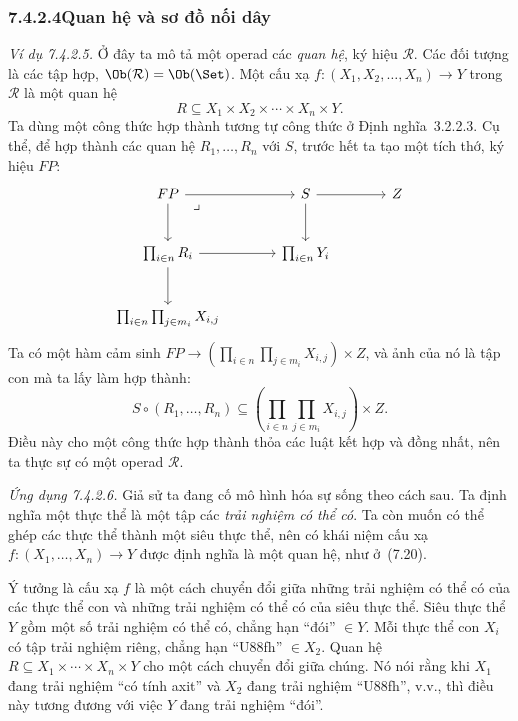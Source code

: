 \subsubsection*{7.4.2.4\quad Quan hệ và sơ đồ nối dây}
\noindent\textit{Ví dụ 7.4.2.5.}\keepwithnext
Ở đây ta mô tả một operad các \emph{quan hệ}, ký hiệu $\mathcal R$. Các đối tượng là các tập hợp, $\Ob(\mathcal R)=\Ob(\Set)$. Một cấu xạ $f:(X_1,X_2,\ldots,X_n)\to Y$ trong $\mathcal R$ là một quan hệ
\begin{equation}
R\subseteq X_1\times X_2\times\cdots\times X_n\times Y.
\tag{7.20}
\end{equation}
Ta dùng một công thức hợp thành tương tự công thức ở Định nghĩa~3.2.2.3. Cụ thể, để hợp thành các quan hệ $R_1,\ldots,R_n$ với $S$, trước hết ta tạo một tích thớ, ký hiệu $FP$:
\[
\begin{tikzcd}[column sep=large,row sep=large]
FP\arrow[r]\arrow[d]\arrow[dr,phantom,"\lrcorner",very near start]&S\arrow[r]\arrow[d]&Z\\
\prod_{i\in n}R_i\arrow[r]\arrow[d]&\prod_{i\in n}Y_i&\\
\prod_{i\in n}\prod_{j\in m_i}X_{i,j}&&
\end{tikzcd}
\]
Ta có một hàm cảm sinh $FP\to\left(\prod_{i\in n}\prod_{j\in m_i}X_{i,j}\right)\times Z$, và ảnh của nó là tập con mà ta lấy làm hợp thành:
\[
S\circ(R_1,\ldots,R_n)\subseteq\left(\prod_{i\in n}\prod_{j\in m_i}X_{i,j}\right)\times Z.
\]
Điều này cho một công thức hợp thành thỏa các luật kết hợp và đồng nhất, nên ta thực sự có một operad $\mathcal R$.

\noindent\textit{Ứng dụng 7.4.2.6.}\keepwithnext
Giả sử ta đang cố mô hình hóa sự sống theo cách sau. Ta định nghĩa một thực thể là một tập các \emph{trải nghiệm có thể có}. Ta còn muốn có thể ghép các thực thể
thành một siêu thực thể, nên có khái niệm cấu xạ $f:(X_1,\ldots,X_n)\to Y$ được định nghĩa là một quan hệ, như ở~(7.20).

Ý tưởng là cấu xạ $f$ là một cách chuyển đổi giữa những trải nghiệm có thể có của các thực thể con và những trải nghiệm có thể có của siêu thực thể. Siêu thực thể $Y$ gồm một số trải nghiệm có thể có, chẳng hạn ``đói'' $\in Y$. Mỗi thực thể con $X_i$ có tập trải nghiệm riêng, chẳng hạn ``U88fh'' $\in X_2$. Quan hệ $R\subseteq X_1\times\cdots\times X_n\times Y$ cho một cách chuyển đổi giữa chúng. Nó nói rằng khi $X_1$ đang trải nghiệm ``có tính axit'' và $X_2$ đang trải nghiệm ``U88fh'', v.v., thì điều này tương đương với việc $Y$ đang trải nghiệm ``đói''.

